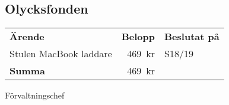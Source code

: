\documentclass[../_main/handlingar.tex]{subfiles}
\begin{document}
\subsection*{Olycksfonden}
\begin{tabular}{l r l}
    \textbf{Ärende} & \textbf{Belopp} & \textbf{Beslutat på} \\
    Stulen MacBook laddare & \SI{469}{kr} & S18/19 \\
    \hline
    \textbf{Summa} & \SI{469}{kr} \\
\end{tabular}

\begin{signatures}{1}
    \ist
    \signature{Henrik Ramström}{Förvaltningschef}
\end{signatures}
\end{document}
